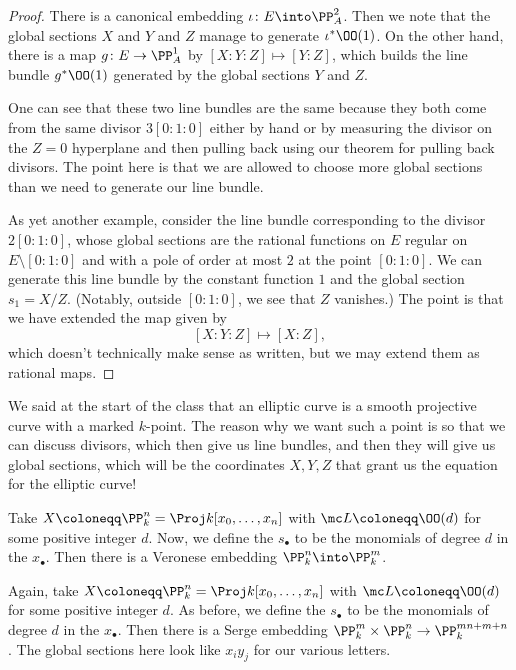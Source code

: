 \documentclass[../notes.tex]{subfiles}
\begin{document}
\begin{proof}
	There is a canonical embedding $\iota\colon E\into\PP^2_A$. Then we note that the global sections $X$ and $Y$ and $Z$ manage to generate $\iota^*\OO(1)$. On the other hand, there is a map $g\colon E\to\PP^1_A$ by $[X:Y:Z]\mapsto[Y:Z]$, which builds the line bundle $g^*\OO(1)$ generated by the global sections $Y$ and $Z$.

	One can see that these two line bundles are the same because they both come from the same divisor $3[0:1:0]$ either by hand or by measuring the divisor on the $Z=0$ hyperplane and then pulling back using our theorem for pulling back divisors. The point here is that we are allowed to choose more global sections than we need to generate our line bundle.

	As yet another example, consider the line bundle corresponding to the divisor $2[0:1:0]$, whose global sections are the rational functions on $E$ regular on $E\setminus[0:1:0]$ and with a pole of order at most $2$ at the point $[0:1:0]$. We can generate this line bundle by the constant function $1$ and the global section $s_1=X/Z$. (Notably, outside $[0:1:0]$, we see that $Z$ vanishes.) The point is that we have extended the map given by
	\[[X:Y:Z]\mapsto[X:Z],\]
	which doesn't technically make sense as written, but we may extend them as rational maps.
\end{proof}
\begin{remark}
	We said at the start of the class that an elliptic curve is a smooth projective curve with a marked $k$-point. The reason why we want such a point is so that we can discuss divisors, which then give us line bundles, and then they will give us global sections, which will be the coordinates $X,Y,Z$ that grant us the equation for the elliptic curve!
\end{remark}
\begin{example}
	Take $X\coloneqq\PP^n_k=\Proj k[x_0,\ldots,x_n]$ with $\mc L\coloneqq\OO(d)$ for some positive integer $d$. Now, we define the $s_\bullet$ to be the monomials of degree $d$ in the $x_\bullet$. Then there is a Veronese embedding $\PP^n_k\into\PP^m_k$.
\end{example}
\begin{example}
	Again, take $X\coloneqq\PP^n_k=\Proj k[x_0,\ldots,x_n]$ with $\mc L\coloneqq\OO(d)$ for some positive integer $d$. As before, we define the $s_\bullet$ to be the monomials of degree $d$ in the $x_\bullet$. Then there is a Serge embedding $\PP^m_k\times\PP^n_k\to\PP^{mn+m+n}_k$. The global sections here look like $x_iy_j$ for our various letters.
\end{example}
\end{document}
